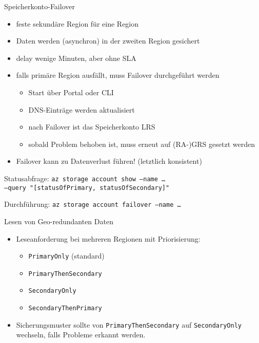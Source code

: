 \begin{flashcard}[Definition]{Speicherkonto-Failover}
    \begin{itemize}
        \item feste sekundäre Region für eine Region
        \item Daten werden (asynchron) in der zweiten Region gesichert
        \item delay wenige Minuten, aber ohne SLA
        \item falls primäre Region ausfällt, muss Failover durchgeführt werden
        \begin{itemize}
            \item Start über Portal oder CLI
            \item DNS-Einträge werden aktualisiert
            \item nach Failover ist das Speicherkonto LRS
            \item sobald Problem behoben ist, muss erneut auf (RA-)GRS gesetzt werden
        \end{itemize}
        \item Failover kann zu Datenverlust führen! (letztlich konsistent)
    \end{itemize}
    Statusabfrage: \texttt{az storage account show --name \ldots\\--query "[statusOfPrimary, statusOfSecondary]"}

    Durchführung: \texttt{az storage account failover --name \ldots}
\end{flashcard}

\begin{flashcard}[Definition]{Lesen von Geo-redundanten Daten}
    \begin{itemize}
        \item Leseanforderung bei mehreren Regionen mit Priorisierung:
        \begin{itemize}
            \item \texttt{PrimaryOnly} (standard)
            \item \texttt{PrimaryThenSecondary}
            \item \texttt{SecondaryOnly}
            \item \texttt{SecondaryThenPrimary}
        \end{itemize}
        \item Sicherungsmuster sollte von \texttt{PrimaryThenSecondary} auf \texttt{SecondaryOnly} wechseln, falls Probleme erkannt werden.
    \end{itemize}
\end{flashcard}

